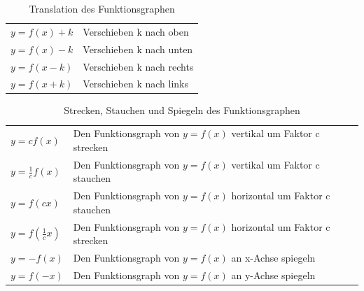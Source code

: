 \documentclass[a4paper]{article}
\begin{document}
\begin{table}[t]
\renewcommand*{\arraystretch}{1.4}
\centering
\begin{tabular}{l l} \hline
$y=f(x)+k$ & Verschieben k nach oben \\
$y=f(x)-k$ & Verschieben k nach unten \\
$y=f(x-k)$ & Verschieben k nach rechts \\
$y=f(x+k)$ & Verschieben k nach links \\
\hline
\end{tabular}
\caption{\label{tab:graphtranslation}{Translation des Funktionsgraphen}}
\end{table}

\begin{table}[b]
\renewcommand*{\arraystretch}{1.4}
\centering
\begin{tabular}{l l} \hline
$y=cf(x)$ & Den Funktionsgraph von $y=f(x)$ vertikal um Faktor c strecken \\
$y=\frac{1}{c}f(x)$ & Den Funktionsgraph von $y=f(x)$ vertikal um Faktor c stauchen \\
$y=f(cx)$ & Den Funktionsgraph von $y=f(x)$ horizontal um Faktor c stauchen \\
$y=f(\frac{1}{c}x)$ & Den Funktionsgraph von $y=f(x)$ horizontal um Faktor c strecken \\
$y=-f(x)$ & Den Funktionsgraph von $y=f(x)$ an x-Achse spiegeln \\
$y=f(-x)$ & Den Funktionsgraph von $y=f(x)$ an y-Achse spiegeln \\
\hline
\end{tabular}
\caption{\label{tab:graphtransformation}{Strecken, Stauchen und Spiegeln des Funktionsgraphen}}
\end{table}
\end{document}
